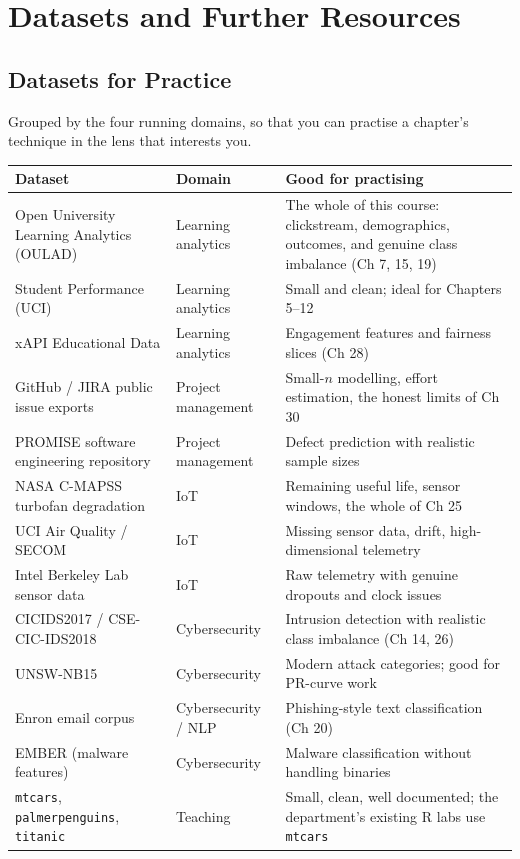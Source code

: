 \chapter{Datasets and Further Resources}\label{app:resources}
\normalfigures

\section{Datasets for Practice}

Grouped by the four running domains, so that you can practise a chapter's technique
in the lens that interests you.

\begin{longtable}{@{}L{4.2cm}L{3.0cm}L{6.8cm}@{}}
\toprule
{}
\textbf{Dataset} & \textbf{Domain} & \textbf{Good for practising} \\
\midrule
\endhead
Open University Learning Analytics (OULAD) & Learning analytics & The whole of this course: clickstream, demographics, outcomes, and genuine class imbalance (Ch 7, 15, 19) \\
Student Performance (UCI) & Learning analytics & Small and clean; ideal for Chapters 5--12 \\
xAPI Educational Data & Learning analytics & Engagement features and fairness slices (Ch 28) \\
\addlinespace
GitHub / JIRA public issue exports & Project management & Small-$n$ modelling, effort estimation, the honest limits of Ch 30 \\
PROMISE software engineering repository & Project management & Defect prediction with realistic sample sizes \\
\addlinespace
NASA C-MAPSS turbofan degradation & IoT & Remaining useful life, sensor windows, the whole of Ch 25 \\
UCI Air Quality / SECOM & IoT & Missing sensor data, drift, high-dimensional telemetry \\
Intel Berkeley Lab sensor data & IoT & Raw telemetry with genuine dropouts and clock issues \\
\addlinespace
CICIDS2017 / CSE-CIC-IDS2018 & Cybersecurity & Intrusion detection with realistic class imbalance (Ch 14, 26) \\
UNSW-NB15 & Cybersecurity & Modern attack categories; good for PR-curve work \\
Enron email corpus & Cybersecurity / NLP & Phishing-style text classification (Ch 20) \\
EMBER (malware features) & Cybersecurity & Malware classification without handling binaries \\
\addlinespace
\texttt{mtcars}, \texttt{palmerpenguins}, \texttt{titanic} & Teaching & Small, clean, well documented; the department's existing R labs use \texttt{mtcars} \\
\bottomrule
\end{longtable}

